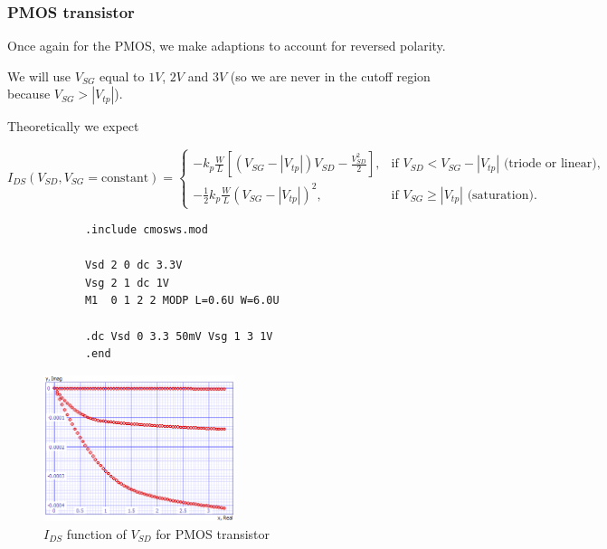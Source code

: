 \documentclass[../main.tex]{subfiles}
\begin{document}
{{		}
		
		\subsubsection{PMOS transistor}
		{
			
		Once again for the PMOS, we make adaptions to account for reversed polarity.
		
		We will use $V_{SG}$ equal to $1V$, $2V$ and $3V$ (so we are never in the cutoff region because $V_{SG} > |V_{tp}|$).
		
		Theoretically we expect
		
		\begin{equation}
			I_{DS}(V_{SD}, V_{SG} = \text{constant}) = 
			\begin{cases} 
				-k_p \frac{W}{L} \left[(V_{SG} - |V_{tp}|)V_{SD} - \frac{V_{SD}^2}{2}\right], & \text{if } V_{SD} < V_{SG} - |V_{tp}| \text{ (triode or linear)}, \\[5pt]
				-\frac{1}{2} k_p \frac{W}{L} (V_{SG} - |V_{tp}|)^2, & \text{if } V_{SG} \geq |V_{tp}| \text{ (saturation)}.
			\end{cases}
		\end{equation}
		
		\begin{lstlisting}
			.include cmosws.mod
			
			Vsd 2 0 dc 3.3V
			Vsg 2 1 dc 1V
			M1  0 1 2 2 MODP L=0.6U W=6.0U
			
			.dc Vsd 0 3.3 50mV Vsg 1 3 1V
			.end
		\end{lstlisting}
		
		\begin{figure}[H]
			\centering
			\includegraphics[width=0.5\textwidth]{plots/Q2_pmos.png}
			\caption{$I_{DS}$ function of $V_{SD}$ for PMOS transistor}
		\end{figure}
	
		}
	}
	
\end{document}
